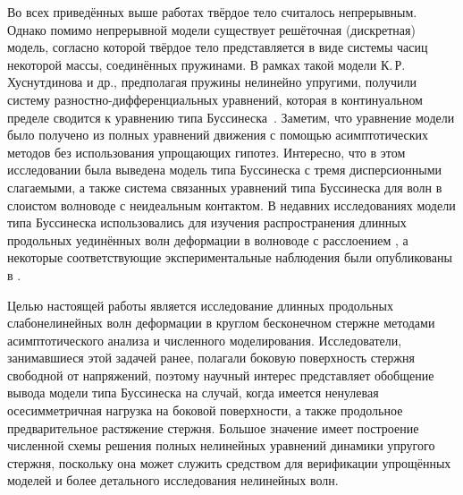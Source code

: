 \documentclass[12pt, a4paper]{report}
\begin{document}
Во всех приведённых выше работах твёрдое тело считалось непрерывным. Однако помимо непрерывной модели существует решёточная (дискретная) модель, согласно которой твёрдое тело представляется в виде системы часиц некоторой массы, соединённых пружинами. В рамках такой модели К.\,Р. Хуснутдинова и др., предполагая пружины нелинейно упругими, получили систему разностно-дифференциальных уравнений, которая в континуальном пределе сводится к уравнению типа Буссинеска~\cite{KSZ}. Заметим, что уравнение модели было получено из полных уравнений движения с помощью асимптотических методов без использования упрощающих гипотез. Интересно, что в этом исследовании была выведена модель типа Буссинеска с тремя дисперсионными слагаемыми, а также система связанных уравнений типа Буссинеска для волн в слоистом волноводе с неидеальным контактом.
В недавних исследованиях модели типа Буссинеска использовались для изучения распространения длинных продольных уединённых волн деформации в волноводе с расслоением \cite{KS, KT1, KT2}, а некоторые соответствующие экспериментальные наблюдения были опубликованы в \cite{JAP2010, JAP2012}. 

Целью настоящей работы является исследование длинных продольных слабонелинейных волн деформации в круглом бесконечном стержне методами асимптотического анализа и численного моделирования. Исследователи, занимавшиеся этой задачей ранее, полагали боковую поверхность стержня свободной от напряжений, поэтому научный интерес представляет обобщение вывода модели типа Буссинеска на случай, когда имеется ненулевая осесимметричная нагрузка на боковой поверхности, а также продольное предварительное растяжение стержня.
Большое значение имеет построение численной схемы решения полных нелинейных уравнений динамики упругого стержня, поскольку она может служить средством для верификации упрощённых моделей и более детального исследования нелинейных волн.
\end{document}
